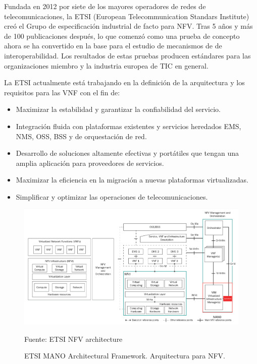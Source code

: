 Fundada en 2012 por siete de los mayores operadores de redes de telecomunicaciones, la ETSI (European Telecommunication Standars Institute) creó el Grupo de especificación industrial de facto para NFV. Tras 5 años y más de 100 publicaciones después, lo que comenzó como una prueba de concepto ahora se ha convertido en la base para el estudio de mecanismos de de interoperabilidad. Los resultados de estas pruebas producen estándares para las organizaciones miembro y la industria europea de TIC en general.\cite{noauthor_etsi_nodate}

La ETSI actualmente está trabajando en la definición de la arquitectura y los requisitos para las VNF con el fin de:

\begin{itemize}
\item Maximizar la estabilidad y garantizar la confiabilidad del servicio.
\item Integración fluida con plataformas existentes y servicios heredados EMS, NMS, OSS, BSS y de orquestación de red.
\item Desarrollo de soluciones altamente efectivas y portátiles que tengan una amplia aplicación para proveedores de servicios.
\item Maximizar la eficiencia en la migración a nuevas plataformas virtualizadas.
\item Simplificar y optimizar las operaciones de telecomunicaciones.
\end{itemize}

\begin{figure}
    \centering
    \includegraphics[width=1\textwidth]{imagenes/capitulo1/NFV_arquitectura.png}
    \caption{ETSI MANO Architectural Framework. Arquitectura para  NFV.}
	\vspace{0.3cm}
    \footnotesize{Fuente: ETSI NFV architecture}
    \label{arquitectura-NFV}
\end{figure}

